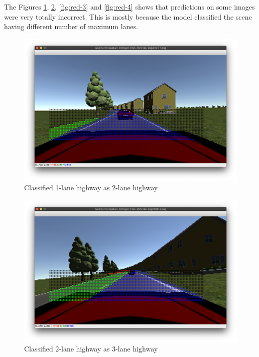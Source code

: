 \par
The Figures \ref{fig:red-1}, \ref{fig:red-2}, \ref{fig:red-3} and \ref{fig:red-4} shows that predictions on some images were very totally incorrect. This is mostly because the model classified the scene having different number of maximum lanes.
\begin{figure}[H]
  \centering
  \includegraphics[scale=0.31]{images/Chapter5/lane1-red.png}
  \caption{Classified 1-lane highway as 2-lane highway}
  \label{fig:red-1}
\end{figure}
\begin{figure}[H]
  \centering
  \includegraphics[scale=0.31]{images/Chapter5/lane2-red.png}
  \caption{Classified 2-lane highway as 3-lane highway}
  \label{fig:red-2}
\end{figure}

